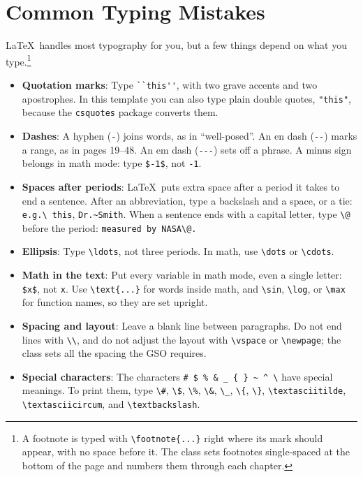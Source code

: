 \section{Common Typing Mistakes}
\label{sec:typing}

\LaTeX\ handles most typography for you, but a few things depend on what you type.\footnote{A footnote is typed with \texttt{\textbackslash footnote\{...\}} right where its mark should appear, with no space before it. The class sets footnotes single-spaced at the bottom of the page and numbers them through each chapter.}
\begin{itemize}
\item \textbf{Quotation marks}: Type \verb+``this''+, with two grave accents and two apostrophes. In this template you can also type plain double quotes, \verb+"this"+, because the \texttt{csquotes} package converts them.
\item \textbf{Dashes}: A hyphen (\verb+-+) joins words, as in ``well-posed''. An en dash (\verb+--+) marks a range, as in pages 19--48. An em dash (\verb+---+) sets off a phrase. A minus sign belongs in math mode: type \verb+$-1$+, not \verb+-1+.
\item \textbf{Spaces after periods}: \LaTeX\ puts extra space after a period it takes to end a sentence. After an abbreviation, type a backslash and a space, or a tie: \verb+e.g.\ this+, \verb+Dr.~Smith+. When a sentence ends with a capital letter, type \verb+\@+ before the period: \verb+measured by NASA\@.+
\item \textbf{Ellipsis}: Type \verb+\ldots+, not three periods. In math, use \verb+\dots+ or \verb+\cdots+.
\item \textbf{Math in the text}: Put every variable in math mode, even a single letter: \verb+$x$+, not \verb+x+. Use \verb+\text{...}+ for words inside math, and \verb+\sin+, \verb+\log+, or \verb+\max+ for function names, so they are set upright.
\item \textbf{Spacing and layout}: Leave a blank line between paragraphs. Do not end lines with \verb+\\+, and do not adjust the layout with \verb+\vspace+ or \verb+\newpage+; the class sets all the spacing the GSO requires.
\item \textbf{Special characters}: The characters \verb+# $ % & _ { } ~ ^ \+ have special meanings. To print them, type \verb+\#+, \verb+\$+, \verb+\%+, \verb+\&+, \verb+\_+, \verb+\{+, \verb+\}+, \verb+\textasciitilde+, \verb+\textasciicircum+, and \verb+\textbackslash+.
\end{itemize}
